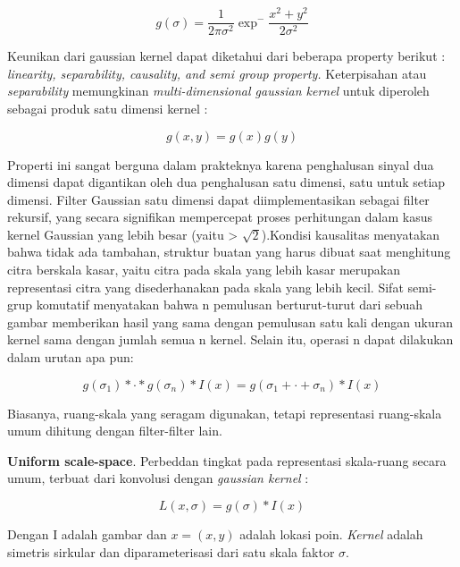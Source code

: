 \begin{equation*}
g(\sigma) = \frac{1}{2\pi\sigma^2}\exp^-\frac{x^2+y^2}{2\sigma^2}
\end{equation*}

Keunikan dari gaussian kernel dapat diketahui dari beberapa property berikut : 
\emph{linearity, separability, causality, and semi group property.} Keterpisahan 
atau \emph{separability} memungkinan \emph{multi-dimensional gaussian kernel} 
untuk diperoleh sebagai produk satu dimensi kernel : 

\begin{equation*}
  g(x,y) = g(x)g(y)
\end{equation*}

Properti ini sangat berguna dalam prakteknya karena penghalusan 
sinyal dua dimensi dapat digantikan oleh dua penghalusan satu dimensi, 
satu untuk setiap dimensi. Filter Gaussian satu dimensi dapat 
diimplementasikan sebagai filter rekursif, yang secara signifikan 
mempercepat proses perhitungan dalam kasus kernel Gaussian yang lebih besar 
(yaitu > \(\sqrt{2}\)).Kondisi kausalitas menyatakan bahwa tidak ada tambahan, 
struktur buatan yang harus dibuat saat menghitung citra berskala kasar, yaitu citra 
pada skala yang lebih kasar merupakan representasi citra yang disederhanakan pada 
skala yang lebih kecil. Sifat semi-grup komutatif menyatakan bahwa n pemulusan 
berturut-turut dari sebuah gambar memberikan hasil yang sama dengan pemulusan satu 
kali dengan ukuran kernel sama dengan jumlah semua n kernel. Selain itu, 
operasi n dapat dilakukan dalam urutan apa pun:

\begin{equation*}
g(\sigma_{1}) * \cdot * g(\sigma_{n}) * I(x) = g(\sigma_{1} + \cdot + \sigma_{n}) * I(x)
\end{equation*}

Biasanya, ruang-skala yang seragam digunakan, tetapi representasi ruang-skala umum dihitung dengan filter-filter lain.

\textbf{Uniform scale-space}. Perbeddan tingkat pada representasi skala-ruang
secara umum, terbuat dari konvolusi dengan \emph{gaussian kernel} :

\begin{equation*}
L(x,\sigma) = g(\sigma) * I(x)
\end{equation*}

Dengan I adalah gambar dan \(x = (x,y)\) adalah lokasi poin.
\emph{Kernel} adalah simetris sirkular dan diparameterisasi dari satu skala faktor \(\sigma \).

